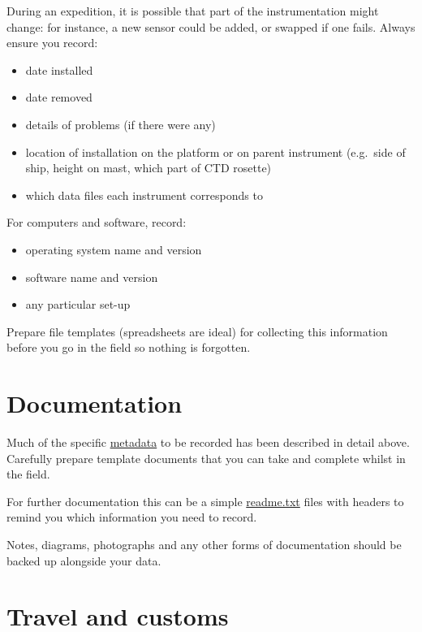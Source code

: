 \documentclass[12pt,a4paper,oneside]{report}
\providecommand{\tightlist}{%
  \setlength{\itemsep}{0pt}\setlength{\parskip}{0pt}}
\begin{document}
During an expedition, it is possible that part of the instrumentation
might change: for instance, a new sensor could be added, or swapped if
one fails. Always ensure you record:

\begin{itemize}
\tightlist
\item
  date installed
\item
  date removed
\item
  details of problems (if there were any)
\item
  location of installation on the platform or on parent instrument
  (e.g.~side of ship, height on mast, which part of CTD rosette)
\item
  which data files each instrument corresponds to
\end{itemize}

For computers and software, record:

\begin{itemize}
\tightlist
\item
  operating system name and version
\item
  software name and version
\item
  any particular set-up
\end{itemize}

Prepare file templates (spreadsheets are ideal) for collecting this
information before you go in the field so nothing is forgotten.

\hypertarget{documentation}{%
\section{Documentation}\label{documentation}}

Much of the specific \protect\hyperlink{metadata}{metadata} to be
recorded has been described in detail above. Carefully prepare template
documents that you can take and complete whilst in the field.

For further documentation this can be a simple
\protect\hyperlink{readmetxt}{readme.txt} files with headers to remind
you which information you need to record.

Notes, diagrams, photographs and any other forms of documentation should
be backed up alongside your data.

\hypertarget{travel-and-customs}{%
\section{Travel and customs}\label{travel-and-customs}}
\end{document}
